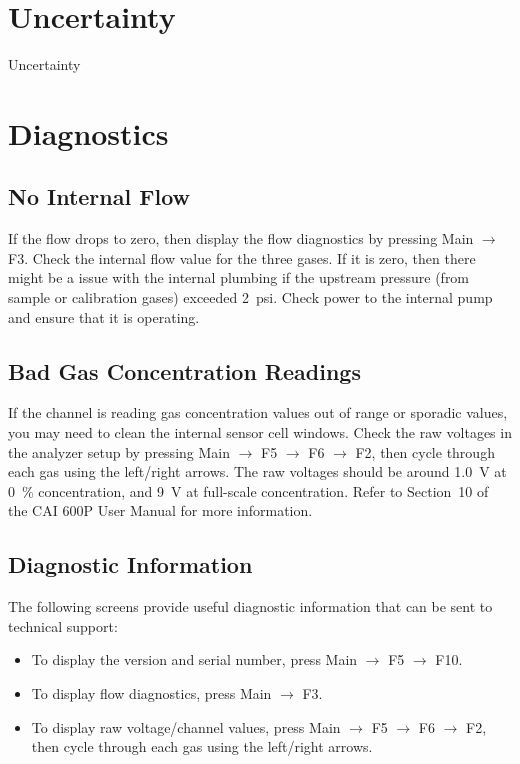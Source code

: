 \documentclass[11pt,oneside]{book}
\begin{document}
\section{Uncertainty}

Uncertainty

\section{Diagnostics}

\subsection{No Internal Flow}

If the flow drops to zero, then display the flow diagnostics by pressing Main $\rightarrow$ F3. Check the internal flow value for the three gases. If it is zero, then there might be a issue with the internal plumbing if the upstream pressure (from sample or calibration gases) exceeded 2~psi. Check power to the internal pump and ensure that it is operating.

\subsection{Bad Gas Concentration Readings}

If the channel is reading gas concentration values out of range or sporadic values, you may need to clean the internal sensor cell windows. Check the raw voltages in the analyzer setup by pressing Main $\rightarrow$ F5 $\rightarrow$ F6 $\rightarrow$ F2, then cycle through each gas using the left/right arrows. The raw voltages should be around 1.0~V at 0~\% concentration, and 9~V at full-scale concentration. Refer to Section~10 of the CAI 600P User Manual for more information.

\subsection{Diagnostic Information}

The following screens provide useful diagnostic information that can be sent to technical support:
\begin{itemize}
\item To display the version and serial number, press Main $\rightarrow$ F5 $\rightarrow$ F10.
\item To display flow diagnostics, press Main $\rightarrow$ F3.
\item To display raw voltage/channel values, press Main $\rightarrow$ F5 $\rightarrow$ F6 $\rightarrow$ F2, then cycle through each gas using the left/right arrows.
\end{itemize}
\end{document}
